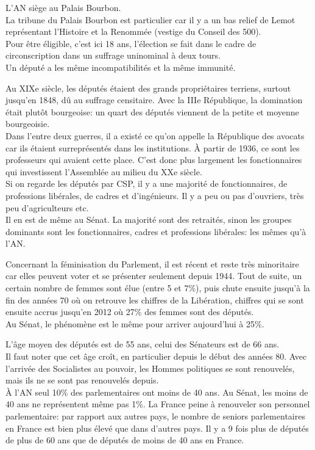 \documentclass[12pt, a4paper, openany]{book}
\begin{document}
L'AN siège au Palais Bourbon. \\
La tribune du Palais Bourbon est particulier car il y a un bas relief de Lemot représentant l'Histoire et la Renommée (vestige du Conseil des 500). \\
Pour être éligible, c'est ici 18 ans, l'élection se fait dans le cadre de circonscription dans un suffrage uninominal à deux tours. \\
Un député a les même incompatibilités et la même immunité. 


Au XIXe siècle, les députés étaient des grands propriétaires terriens, surtout jusqu'en 1848, dû au suffrage censitaire. Avec la IIIe République, la domination était plutôt bourgeoise: un quart des députés viennent de la petite et moyenne bourgeoisie. \\
Dans l'entre deux guerres, il a existé ce qu'on appelle la République des avocats car ils étaient surreprésentés dans les institutions. À partir de 1936, ce sont les professeurs qui avaient cette place. C'est donc plus largement les fonctionnaires qui investissent l'Assemblée au milieu du XXe siècle. \\
Si on regarde les députés par CSP, il y a une majorité de fonctionnaires, de professions libérales, de cadres et d'ingénieurs. Il y a peu ou pas d'ouvriers, très peu d'agriculteurs etc. \\
Il en est de même au Sénat. La majorité sont des retraités, sinon les groupes dominants sont les fonctionnaires, cadres et professions libérales: les mêmes qu'à l'AN.


Concernant la féminisation du Parlement, il est récent et reste très minoritaire car elles peuvent voter et se présenter seulement depuis 1944. Tout de suite, un certain nombre de femmes sont élue (entre 5 et 7\%), puis chute ensuite jusqu'à la fin des années 70 où on retrouve les chiffres de la Libération, chiffres qui se sont ensuite accrus jusqu'en 2012 où 27\% des femmes sont des députés. \\
Au Sénat, le phénomène est le même pour arriver aujourd'hui à 25\%. 


L'âge moyen des députés est de 55 ans, celui des Sénateurs est de 66 ans. \\
Il faut noter que cet âge croît, en particulier depuis le début des années 80. Avec l'arrivée des Socialistes au pouvoir, les Hommes politiques se sont renouvelés, mais ils ne se sont pas renouvelés depuis. \\
À l'AN seul 10\% des parlementaires ont moins de 40 ans. Au Sénat, les moins de 40 ans ne représentent même pas 1\%. La France peine à renouveler son personnel parlementaire: par rapport aux autres pays, le nombre de seniors parlementaires en France est bien plus élevé que dans d'autres pays. Il y a 9 fois plus de députés de plus de 60 ans que de députés de moins de 40 ans en France. 
\end{document}
